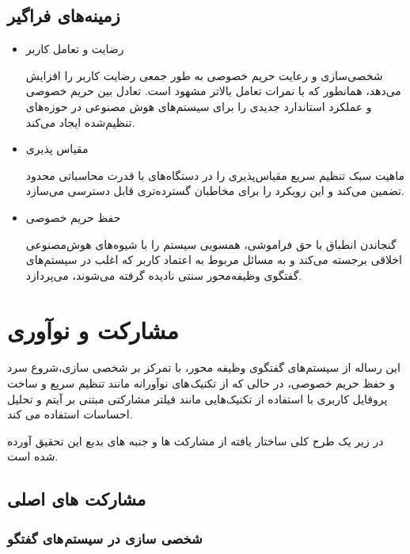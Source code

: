 \subsection{زمینه‌های فراگیر}

\begin{itemize}
\item
رضایت و تعامل کاربر

 شخصی‌سازی و رعایت حریم خصوصی به طور جمعی رضایت کاربر را افزایش می‌دهد، همانطور که با نمرات تعامل بالاتر مشهود است.
 تعادل بین حریم خصوصی و عملکرد استاندارد جدیدی را برای سیستم‌های هوش مصنوعی در حوزه‌های تنظیم‌شده ایجاد می‌کند.
\item
مقیاس پذیری

ماهیت سبک تنظیم سریع مقیاس‌پذیری را در دستگاه‌های با قدرت محاسباتی محدود تضمین می‌کند و این رویکرد را برای مخاطبان گسترده‌تری قابل دسترسی می‌سازد.
\item
حفظ حریم خصوصی

گنجاندن انطباق با حق فراموشی، همسویی سیستم را با شیوه‌های هوش‌مصنوعی اخلاقی برجسته می‌کند و به مسائل مربوط به اعتماد کاربر که اغلب در سیستم‌های گفتگوی وظیفه‌محور سنتی نادیده گرفته می‌شوند، می‌پردازد.
\end{itemize}

\section{مشارکت و نوآوری}
این رساله از سیستم‌های گفتگوی وظیفه محور، با تمرکز بر شخصی سازی،شروع سرد و حفظ حریم خصوصی، در حالی که از تکنیک های نوآورانه مانند تنظیم سریع و ساخت پروفایل کاربری با استفاده از تکنیک‌هایی مانند فیلتر مشارکتی مبتنی بر آیتم و تحلیل احساسات استفاده می کند.

در زیر یک طرح کلی ساختار یافته از مشارکت ها و جنبه های بدیع این تحقیق آورده شده است.

\subsection{مشارکت های اصلی}
\subsubsection{شخصی سازی در سیستم های گفتگو}


